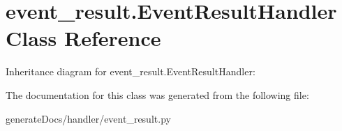 \hypertarget{classevent__result_1_1_event_result_handler}{}\section{event\+\_\+result.\+Event\+Result\+Handler Class Reference}
\label{classevent__result_1_1_event_result_handler}


Inheritance diagram for event\+\_\+result.\+Event\+Result\+Handler\+:


The documentation for this class was generated from the following file\+:\begin{DoxyCompactItemize}
\item 
generate\+Docs/handler/event\+\_\+result.\+py\end{DoxyCompactItemize}
